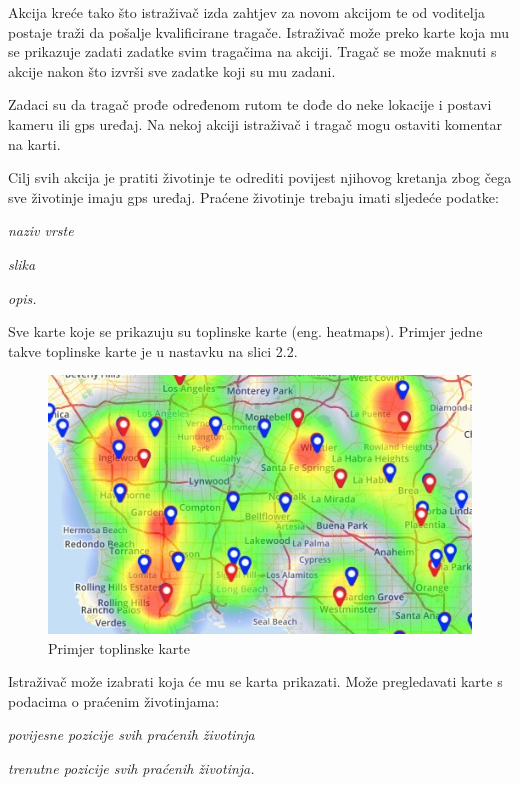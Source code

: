 		Akcija kreće tako što istraživač izda zahtjev za novom akcijom te od voditelja postaje traži da pošalje kvalificirane tragače. Istraživač može preko karte koja mu se prikazuje zadati zadatke svim tragačima na akciji. Tragač se može maknuti s akcije nakon što izvrši sve zadatke koji su mu zadani.
		
		Zadaci su da tragač prođe određenom rutom te dođe do neke lokacije i postavi kameru ili gps uređaj. Na nekoj akciji istraživač i tragač mogu ostaviti komentar na karti.
		
		Cilj svih akcija je pratiti životinje te odrediti povijest njihovog kretanja zbog čega sve životinje imaju gps uređaj. Praćene životinje trebaju imati sljedeće podatke:
		\begin{packed_item}
			\item \textit{naziv vrste}
			\item \textit{slika}
			\item \textit{opis.}
		\end{packed_item}
		
		Sve karte koje se prikazuju su toplinske karte (eng. heatmaps). Primjer jedne takve toplinske karte je u nastavku na slici 2.2.
		
		\begin{figure}[H]
			\includegraphics[scale=0.8]{slike/heatmap.JPG} %
			\centering
			\caption{Primjer toplinske karte}
			\label{fig:prkarte} %
		\end{figure}
		
		Istraživač može izabrati koja će mu se karta prikazati. Može pregledavati karte s podacima o praćenim životinjama:
		\begin{packed_item}
			\item \textit{povijesne pozicije svih praćenih životinja }
			\item \textit{trenutne pozicije svih praćenih životinja.}
		\end{packed_item}
		
